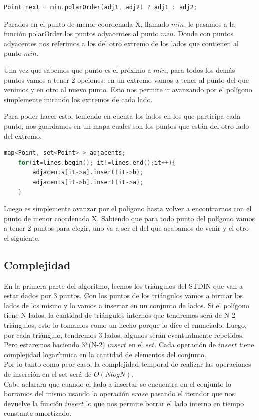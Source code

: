 \documentclass[a4paper]{article}
\begin{document}
\begin{lstlisting}[language=c++]
	Point next = min.polarOrder(adj1, adj2) ? adj1 : adj2;
\end{lstlisting}

Parados en el punto de menor coordenada X, llamado $min$, le pasamos a la función polarOrder los puntos  adyacentes al punto $min$. Donde con puntos adyacentes nos referimos a los del otro extremo de los lados que contienen al punto $min$.

Una vez que sabemos que punto es el próximo a $min$, para todos los demás puntos vamos a tener 2 opciones: en un extremo vamos a tener al punto del que venimos y en otro al nuevo punto. Esto nos permite ir avanzando por el polígono simplemente mirando los extremos de cada lado.

Para poder hacer esto, teniendo en cuenta los lados en los que participa cada punto, nos guardamos en un mapa cuales son los puntos que están del otro lado del extremo.

\begin{lstlisting}[language=c++]
	map<Point, set<Point> > adjacents;
	for(it=lines.begin(); it!=lines.end();it++){
		adjacents[it->a].insert(it->b);
		adjacents[it->b].insert(it->a);
	}
\end{lstlisting}

Luego es simplemente avanzar por el polígono hasta volver a encontrarnos con el punto de menor coordenada X. Sabiendo que para todo punto del polígono vamos a tener 2 puntos para elegir, uno va a ser el del que acabamos de venir y el otro el siguiente.\\

\newpage

\subsection{Complejidad}

En la primera parte del algoritmo, leemos los triángulos del STDIN que van a estar dados por 3 puntos.
Con los puntos de los triángulos vamos a formar los lados de los mismo y lo vamos a insertar en un conjunto de lados.
Si el polígono tiene N lados, la cantidad de triángulos internos que tendremos será de N-2 triángulos, esto lo tomamos como un hecho porque lo dice el enunciado. Luego, por cada triángulo, tendremos 3 lados, algunos serán eventualmente repetidos. Pero estaremos haciendo 3*(N-2) $insert$ en el $set$. Cada operación de $insert$ tiene complejidad logarítmica en la cantidad de elementos del conjunto.\\
Por lo tanto como peor caso, la complejidad temporal de realizar las operaciones de inserción en el set será de $O(N log N)$.\\
Cabe aclarara que cuando el lado a insertar se encuentra en el conjunto lo borramos del mismo usando la operación $erase$ pasando el iterador que nos devuelve la función $insert$ lo que nos permite borrar el lado interno en tiempo constante amortizado.\\
\end{document}
